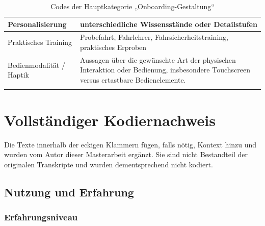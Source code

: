 {\begin{xltabular}{\textwidth}{
    |P{0.30\textwidth}
    |Y|
}
        Personalisierung &
        unterschiedliche Wissensstände oder Detailstufen \\
        \hline

        Praktisches Training &
        Probefahrt, Fahrlehrer, Fahrsicherheitstraining, praktisches
        Erproben \\
        \hline

        Bedienmodalität / Haptik &
        Aussagen über die gewünschte Art der physischen Interaktion oder
        Bedienung, insbesondere Touchscreen versus ertastbare
        Bedienelemente. \\
        \hline

\caption{Codes der Hauptkategorie „Onboarding-Gestaltung“}
\label{tab:codebook-onboarding-gestaltung}
\\

\end{xltabular}
}


\clearpage
\section{Vollständiger Kodiernachweis}
\label{sec:kodiernachweis}

Die Texte innerhalb der eckigen Klammern fügen, falls nötig, Kontext hinzu und wurden vom Autor dieser Masterarbeit ergänzt. Sie sind nicht Bestandteil der originalen Transkripte und wurden dementsprechend nicht kodiert.  

\renewcommand{\arraystretch}{1.18}
\setlength{\LTpre}{0.5em}
\setlength{\LTpost}{1.0em}

\subsection{Nutzung und Erfahrung}
\label{subsec:kodiernachweis-nutzung-und-erfahrung}

\subsubsection{Erfahrungsniveau}

